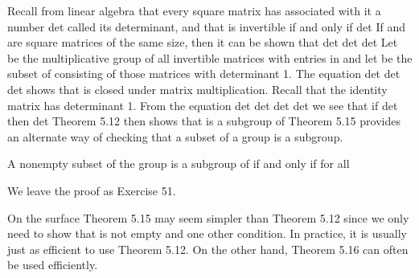 \documentclass[11pt,oneside]{article}
\begin{document}
\begin{BookBody}
 Recall from linear algebra that every square matrix  has associated with it a number det called its determinant, and that  is invertible if and only if det If  and  are square matrices of the same size, then it can be shown that det det det Let  be the multiplicative group of all invertible  matrices with entries in  and let  be the subset of  consisting of those matrices with determinant 1. The equation det det det shows that  is closed under matrix multiplication. Recall that the identity matrix  has determinant 1. From the equation det det det det we see that if det then det Theorem 5.12 then shows that  is a subgroup of \BookEnd{\blacktriangle} Theorem 5.15 provides an alternate way of checking that a subset of a group is a subgroup.

 A nonempty subset  of the group  is a subgroup of  if and only if for all  

 We leave the proof as Exercise 51. \BookEnd{\blacklozenge}

\noindent On the surface Theorem 5.15 may seem simpler than Theorem 5.12 since we only need to show that  is not empty and one other condition. In practice, it is usually just as efficient to use Theorem 5.12. On the other hand, Theorem 5.16 can often be used efficiently.

\end{BookBody}

\BookNarrativetrue
\end{document}
